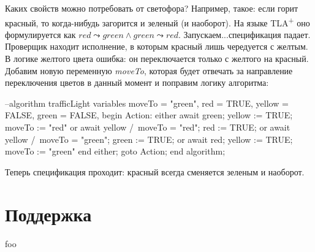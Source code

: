 \documentclass[14pt, openany]{book}
\newcommand{\tlapl}{TLA\textsuperscript{+} }
\begin{document}
Каких свойств можно потребовать от светофора? Например, такое: если горит красный, то когда-нибудь загорится и зеленый (и наоборот). На языке \tlapl оно формулируется как \(red \leadsto green \land green \leadsto red \). Запускаем...спецификация падает. Проверщик находит исполнение, в которым красный лишь чередуется с желтым. В логике желтого цвета ошибка: он переключается только с желтого на красный. Добавим новую переменную \emph{moveTo}, которая будет отвечать за направление переключения цветов в данный момент и поправим логику алгоритма:

\begin{ppcal}
  --algorithm trafficLight
  variables
    moveTo = "green",
    red = TRUE,
    yellow = FALSE,
    green = FALSE,
  begin
    Action:
      either
        await green;
        yellow := TRUE;
        moveTo := "red"
      or 
        await yellow /\ moveTo = "red";
        red := TRUE;
      or 
        await yellow /\ moveTo = "green";
        green := TRUE;
      or 
        await red;
        yellow := TRUE;
        moveTo := "green"
      end either;
    goto Action;
  end algorithm;
\end{ppcal}
\begin{tlatex}
%
%
%
%
%
%
%
%
%
%
%
%
%
%
%
%
%
%
%
%
%
%
%
\end{tlatex}

Теперь спецификация проходит: красный всегда сменяется зеленым и наоборот.

\section{Поддержка}
foo
\end{document}
